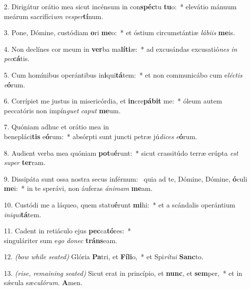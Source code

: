 2. Dirigátur orátio mea sicut incénsum in con\textbf{spéc}tu \textbf{tu}o:~* elevátio mánuum meárum sacrifíci\textit{um} \textit{ves}\textit{per}\textbf{tí}num.

3. Pone, Dómine, custódiam \textbf{o}ri \textbf{me}o:~* et óstium circumstántiæ \textit{lá}\textit{bi}\textit{is} \textbf{me}is.

4. Non declínes cor meum in \textbf{ver}ba ma\textbf{lí}\textbf{ti}æ:~* ad excusándas excusatió\textit{nes} \textit{in} \textit{pec}\textbf{cá}tis.

5. Cum homínibus operántibus in\textbf{i}qui\textbf{tá}tem:~* et non communicábo cum e\textit{léc}\textit{tis} \textit{e}\textbf{ó}rum.

6. Corrípiet me justus in misericórdia, et \textbf{in}cre\textbf{pá}\textbf{bit} me:~* óleum autem peccatóris non impín\textit{guet} \textit{ca}\textit{put} \textbf{me}um.

7. Quóniam adhuc et orátio mea in\\ benepláci\textbf{tis} e\textbf{ó}rum:~* absórpti sunt juncti petræ jú\textit{di}\textit{ces} \textit{e}\textbf{ó}rum.

8. Audient verba mea quóniam \textbf{pot}u\textbf{é}runt:~* sicut crassitúdo terræ erúpta \textit{est} \textit{su}\textit{per} \textbf{ter}ram.

9. Dissipáta sunt ossa nostra secus inférnum:~{\color{red}\GreDagger} quia ad te, Dómine, Dómine, \textbf{ó}culi \textbf{me}i:~* in te sperávi, non áuferas \textit{á}\textit{ni}\textit{mam} \textbf{me}am.

10. Custódi me a láqueo, quem statu\textbf{é}runt \textbf{mi}hi:~* et a scándalis operántium \textit{in}\textit{i}\textit{qui}\textbf{tá}tem.

11. Cadent in retiáculo ejus \textbf{pec}ca\textbf{tó}res:~*\\ singuláriter sum e\textit{go} \textit{do}\textit{nec} \textbf{tráns}eam.

12. {\color{red}\textit{(bow while seated)}} Glória \textbf{Pa}tri, et \textbf{Fí}\textbf{li}o,~* et Spi\textit{rí}\textit{tu}\textit{i} \textbf{Sanc}to.

13. {\color{red}\textit{(rise, remaining seated)}} Sicut erat in princípio, et \textbf{nunc}, et \textbf{sem}per,~* et in s\'{\ae}cula sæ\textit{cu}\textit{ló}\textit{rum}. \textbf{A}men.